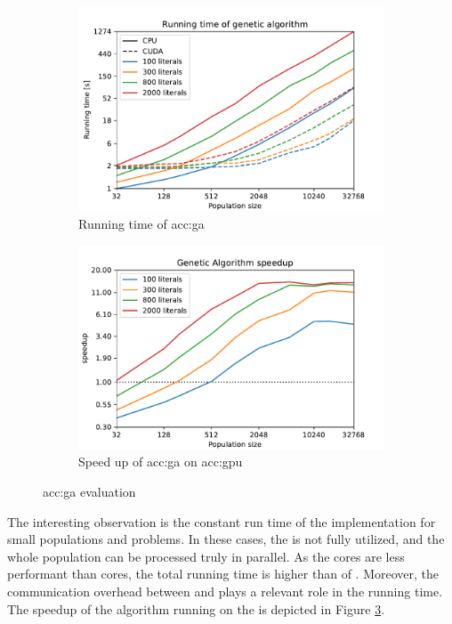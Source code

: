 \begin{figure}[t]
    \begin{subfigure}[t]{0.48\textwidth}
        \includegraphics[width=\textwidth]{img/runs/time_ga_with_legend.pdf}
        \caption{Running time of \acrshort*{acc:ga}}
        \label{fig:garunningtime}
    \end{subfigure}
    \hfill
    \begin{subfigure}[t]{0.48\textwidth}
        \includegraphics[width=\textwidth]{img/runs/speedup_ga.pdf}
        \caption{Speed up of \acrshort*{acc:ga} on \acrshort*{acc:gpu}}
        \label{fig:gpugaspeedup}
    \end{subfigure}
    
    \caption{\acrlong*{acc:ga} evaluation}
\end{figure}

The interesting observation is the constant run time of the \gpu implementation for small populations and problems. In these cases, the \gpu is not fully utilized, and the whole population can be processed truly in parallel. As the \cuda cores are less performant than \cpu cores, the total running time is higher than of \cpuns. Moreover, the communication overhead between \cpu and \gpu plays a relevant role in the running time. The speedup of the algorithm running on the \gpu is depicted in Figure \ref{fig:gpugaspeedup}.

